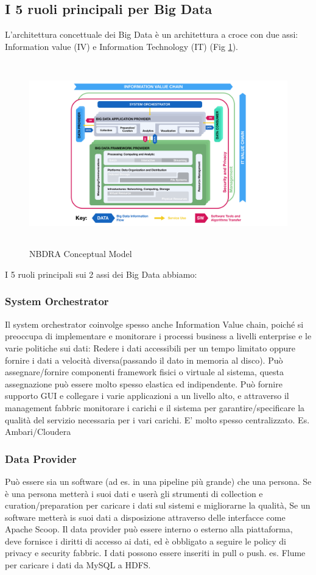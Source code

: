 \documentclass[11pt, twocolumn]{article}
\begin{document}
\subsection{I 5 ruoli principali per Big Data}
L'architettura concettuale dei Big Data è un architettura a croce con due assi: Information value (IV) e Information Technology (IT) (Fig \ref{fig:NBDRA}).\\
\begin{figure}
	\centering
	\includegraphics[width=18cm,height=8cm]{imgs/NBDRA_model}
	\caption{NBDRA Conceptual Model}
	\label{fig:NBDRA}
\end{figure}
I 5 ruoli principali sui 2 assi dei Big Data abbiamo:

\subsubsection{System Orchestrator}
Il system orchestrator coinvolge spesso anche Information Value chain, poiché si preoccupa di implementare e monitorare i processi business a livelli enterprise e le varie politiche sui dati: Redere i dati accessibili per un tempo limitato oppure fornire i dati a velocità diversa(passando il dato in memoria al disco).
Può assegnare/fornire componenti framework fisici o virtuale al sistema, questa assegnazione può essere molto spesso elastica ed indipendente.
Può fornire supporto GUI e collegare i varie applicazioni a un livello alto, e attraverso il management fabbric monitorare i carichi e il sistema per garantire/specificare la qualità del servizio necessaria per i vari carichi.
E' molto spesso centralizzato.
Es. Ambari/Cloudera

\subsubsection{Data Provider}
Può essere sia un software (ad es. in una pipeline più grande) che una persona. Se è una persona metterà i suoi dati e userà gli strumenti di collection e curation/preparation per caricare i dati sul sistemi e migliorarne la qualità, Se un software metterà is suoi dati a disposizione attraverso delle interfacce come Apache Scoop. 
Il data provider può essere interno o esterno alla piattaforma, deve fornisce i diritti di accesso ai dati, ed è obbligato a seguire le policy di privacy e security fabbric. 
I dati possono essere inseriti in pull o push.
es. Flume per caricare i dati da MySQL a HDFS.
\end{document}
